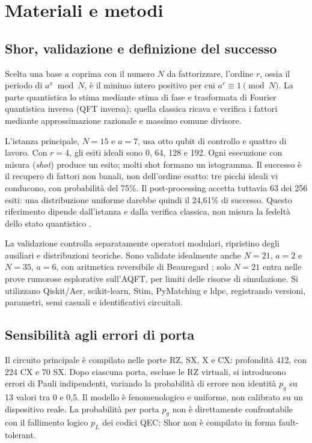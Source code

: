 \section{Materiali e metodi}

\subsection{Shor, validazione e definizione del successo}\label{sec:implementazione}

Scelta una base \(a\) coprima con il numero \(N\) da fattorizzare, l'ordine \(r\), ossia il
periodo di \(a^{x} \bmod N\), è il minimo intero positivo per cui \(a^{r} \equiv 1 \pmod{N}\).
La parte quantistica lo stima mediante stima di fase e trasformata di Fourier quantistica
inversa (QFT inversa); quella classica ricava e verifica i fattori mediante approssimazione
razionale e massimo comune divisore.

L'istanza principale, \(N = 15\) e \(a = 7\), usa otto qubit di controllo e quattro di lavoro.
Con \(r = 4\), gli esiti ideali sono 0, 64, 128 e 192. Ogni esecuzione con misura
(\emph{shot}) produce un esito; molti shot formano un istogramma. Il successo è il recupero di
fattori non banali, non dell'ordine esatto: tre picchi ideali vi conducono, con probabilità
del 75\%. Il post-processing accetta tuttavia 63 dei 256 esiti: una distribuzione uniforme
darebbe quindi il 24,61\% di successo. Questo riferimento dipende dall'istanza e dalla
verifica classica, non misura la fedeltà dello stato quantistico \cite{smolin2013}.

La validazione controlla separatamente operatori modulari, ripristino degli ausiliari e
distribuzioni teoriche. Sono validate idealmente anche \(N = 21\), \(a = 2\) e \(N = 35\),
\(a = 6\), con aritmetica reversibile di Beauregard \cite{beauregard2002}; solo \(N = 21\) entra
nelle prove rumorose esplorative sull'AQFT, per limiti delle risorse di simulazione. Si
utilizzano Qiskit/Aer, scikit-learn, Stim, PyMatching e ldpc, registrando versioni,
parametri, semi casuali e identificativi circuitali.

\subsection{Sensibilità agli errori di porta}

Il circuito principale è compilato nelle porte RZ, SX, X e CX: profondità 412, con 224 CX e
70 SX. Dopo ciascuna porta, escluse le RZ virtuali, si introducono errori di Pauli
indipendenti, variando la probabilità di errore non identità \(p_g\) su 13 valori tra 0 e 0,5.
Il modello è fenomenologico e uniforme, non calibrato su un dispositivo reale. La probabilità
per porta \(p_g\) non è direttamente confrontabile con il fallimento logico \(p_L\) dei codici
QEC: Shor non è compilato in forma fault-tolerant.

